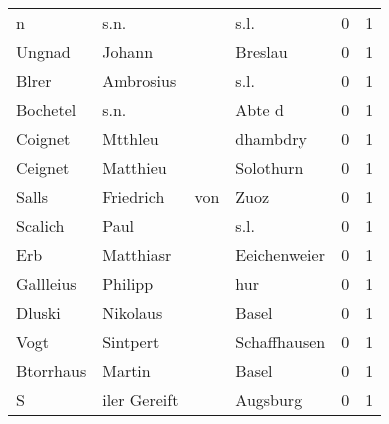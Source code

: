 \documentclass[10pt,a4paper,landscape]{article}
\begin{document}
\begin{longtable}{llllrr}
                        n &                               s.n. &             &                                        s.l. &          0 &         1 \\
                   Ungnad &                             Johann &             &                                     Breslau &          0 &         1 \\
                    Blrer &                          Ambrosius &             &                                        s.l. &          0 &         1 \\
                 Bochetel &                               s.n. &             &                                      Abte d &          0 &         1 \\
                  Coignet &                            Mtthleu &             &                                    dhambdry &          0 &         1 \\
                  Ceignet &                           Matthieu &             &                                   Solothurn &          0 &         1 \\
                    Salls &                          Friedrich &         von &                                        Zuoz &          0 &         1 \\
                  Scalich &                               Paul &             &                                        s.l. &          0 &         1 \\
                      Erb &                          Matthiasr &             &                                Eeichenweier &          0 &         1 \\
                Gallleius &                            Philipp &             &                                         hur &          0 &         1 \\
                   Dluski &                           Nikolaus &             &                                       Basel &          0 &         1 \\
                     Vogt &                           Sintpert &             &                                Schaffhausen &          0 &         1 \\
                Btorrhaus &                             Martin &             &                                       Basel &          0 &         1 \\
                        S &                       iler Gereift &             &                                    Augsburg &          0 &         1 \\

\end{longtable}
\end{document}
